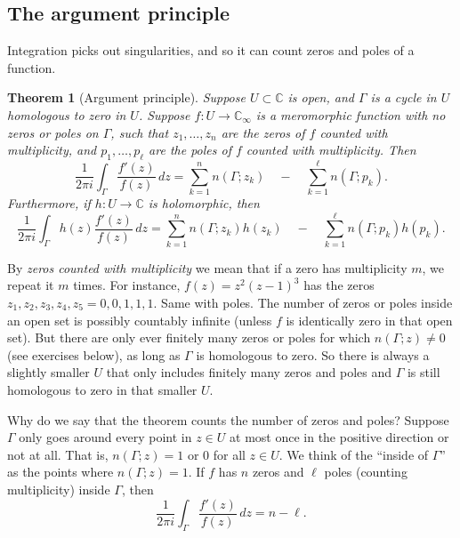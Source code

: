 \documentclass[12pt,openany]{book}
\newcommand{\C}{{\mathbb{C}}}
\newcommand{\myindex}[1]{#1\index{#1}}
\newcommand{\myquote}[1]{``#1''}
\theoremstyle{plain}
\newtheorem{thm}{Theorem}[section]
\theoremstyle{remark}
\theoremstyle{definition}
\theoremstyle{exercise}
\theoremstyle{example}
\begin{document}
\subsection{The argument principle}

Integration picks out singularities, and so it can count zeros and
poles of a function.

\begin{thm}[Argument principle]\label{thm:argprinc}
\pagebreak[2]
Suppose $U \subset \C$ is open, and $\Gamma$ is a cycle in $U$
homologous to zero in $U$.
Suppose $f \colon U \to \C_\infty$ is a meromorphic function with no zeros
or poles on $\Gamma$,
such that
$z_1,\ldots,z_n$ are the 
zeros of $f$ counted with multiplicity,
and $p_1,\ldots,p_\ell$ are the poles of $f$ counted with multiplicity.
Then
\begin{equation*}
\frac{1}{2\pi i}
\int_\Gamma \frac{f'(z)}{f(z)} \, dz
=
\sum_{k=1}^n n(\Gamma;z_k)
\quad
-
\quad
\sum_{k=1}^\ell n(\Gamma;p_k) .
\end{equation*}
Furthermore, if $h \colon U \to \C$ is holomorphic, then
\begin{equation*}
\frac{1}{2\pi i}
\int_\Gamma h(z) \frac{f'(z)}{f(z)} \, dz
=
\sum_{k=1}^n n(\Gamma;z_k)h(z_k) 
\quad
-
\quad
\sum_{k=1}^\ell n(\Gamma;p_k)h(p_k) .
\end{equation*}
\end{thm}

By
\emph{\myindex{zeros counted with multiplicity}}
we mean that if
a zero has multiplicity $m$, we repeat it $m$ times.
For instance, $f(z) = z^2{(z-1)}^3$ has the zeros $z_1,z_2,z_3,z_4,z_5 = 0,0,1,1,1$.
Same with poles.
The number of zeros or poles inside an open set is possibly countably
infinite (unless $f$ is identically zero in that open set).
But there are only ever finitely
many zeros or poles for which 
$n(\Gamma;z) \not= 0$ (see exercises below), as long as $\Gamma$ is
homologous to zero.  So there is always a slightly smaller $U$ that only
includes finitely many zeros and poles and $\Gamma$ is still homologous to
zero in that smaller $U$.

Why do we say that the theorem counts the number of zeros and poles?
Suppose $\Gamma$ only goes around every point in $z \in U$ at most once
in the positive direction or not at all.  That is,
$n(\Gamma;z) = 1$ or $0$ for all $z \in U$.  We think of the
\myquote{inside of $\Gamma$} as the points where $n(\Gamma;z)=1$.
If $f$ has $n$ zeros and $\ell$ poles (counting multiplicity)
inside $\Gamma$, then
\begin{equation*}
\frac{1}{2\pi i}
\int_\Gamma \frac{f'(z)}{f(z)} \, dz
= n - \ell .
\end{equation*}
\end{document}
